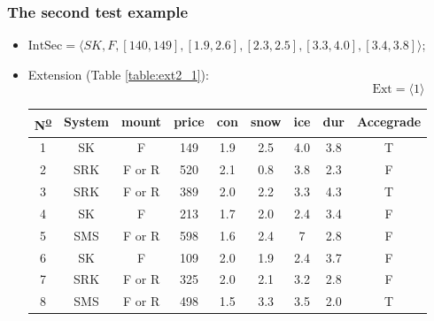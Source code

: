 \documentclass[12pt]{report}
\begin{document}
\begin{solution}
\begin{enumerate}
            \subsubsection*{The second test example}
            \begin{itemize}
              \item $\text{IntSec} = \langle SK, F, [140, 149], [1.9, 2.6], [2.3, 2.5], [3.3, 4.0] , [3.4, 3.8]\rangle$;
              \item Extension (Table \ref{table:ext2_1}):
              \useshortskip
              \[
                  \text{Ext} = \langle 1\rangle
              \]
              \useshortskip
              \begin{table}[H]
                \centering
                \begin{tabular}{|c|c|c|c|c|c|c|c|c|}
                \hline
                N\textsuperscript{\underline{o}} & System                      & mount  & price                       & con & snow                        & ice & dur & Accegrade \\ \hline
                \rowcolor[HTML]{34FF34} 
                1  & SK                          & F      & 149                         & 1.9 & 2.5                         & 4.0 & 3.8 & T         \\ \hline
                2  & \cellcolor[HTML]{FE0000}SRK & F or R & 520                         & 2.1 & 0.8                         & 3.8 & 2.3 & F         \\ \hline
                3  & \cellcolor[HTML]{FE0000}SRK & F or R & 389                         & 2.0 & 2.2                         & 3.3 & 4.3 & T         \\ \hline
                4  & SK                          & F      & \cellcolor[HTML]{FE0000}213 & 1.7 & 2.0                         & 2.4 & 3.4 & F         \\ \hline
                5  & \cellcolor[HTML]{FE0000}SMS & F or R & 598                         & 1.6 & 2.4                         & 7   & 2.8 & F         \\ \hline
                6  & SK                          & F      & \cellcolor[HTML]{FE0000}109 & 2.0 & \cellcolor[HTML]{FFFFFF}1.9 & 2.4 & 3.7 & F         \\ \hline
                7  & \cellcolor[HTML]{FE0000}SRK & F or R & 325                         & 2.0 & 2.1                         & 3.2 & 2.8 & F         \\ \hline
                8  & \cellcolor[HTML]{FE0000}SMS & F or R & 498                         & 1.5 & 3.3                         & 3.5 & 2.0 & T         \\ \hline

\end{tabular}
\end{table}
\end{itemize}
\end{enumerate}
\end{solution}
\end{document}
